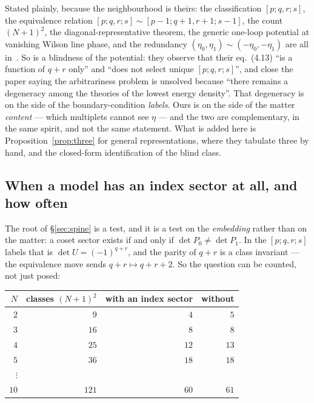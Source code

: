 \documentclass[11pt,a4paper]{article}
\begin{document}
Stated plainly, because the neighbourhood is theirs: the classification $[p;q,r;s]$, the equivalence
relation $[p;q,r;s]\sim[p-1;q+1,r+1;s-1]$, the count $(N+1)^2$, the diagonal-representative theorem,
the generic one-loop potential at vanishing Wilson line phase, and the redundancy
$(\eta_0,\eta_1)\sim(-\eta_0,-\eta_1)$ are all in~\cite{HHK}. So is a blindness of the potential:
they observe that their eq.~(4.13) ``is a function of $q+r$ only'' and ``does not select unique
$[p;q,r;s]$'', and close the paper saying the arbitrariness problem is unsolved because ``there
remains a degeneracy among the theories of the lowest energy density''. That degeneracy is on the
side of the boundary-condition \emph{labels}. Ours is on the side of the matter \emph{content} ---
which multiplets cannot see $\eta$ --- and the two are complementary, in the same spirit, and not the
same statement. What is added here is Proposition~\ref{prop:three} for general representations,
where they tabulate three by hand, and the closed-form identification of the blind class.

\subsection*{When a model has an index sector at all, and how often}

The root of \S\ref{sec:spine} is a test, and it is a test on the \emph{embedding} rather than on the
matter: a coset sector exists if and only if $\det P_0\neq\det P_1$. In the $[p;q,r;s]$ labels that is
$\det U=(-1)^{q+r}$, and the parity of $q+r$ is a class invariant --- the equivalence move sends
$q+r\mapsto q+r+2$. So the question can be counted, not just posed:

\begin{center}\small
{}
\begin{tabular}{rrrr}
\toprule
\rowcolor{hdrblue!14}$N$ & classes $(N+1)^2$ & with an index sector & without\\
\midrule
$2$ & $9$ & $4$ & $5$\\
$3$ & $16$ & $8$ & $8$\\
$4$ & $25$ & $12$ & $13$\\
$5$ & $36$ & $18$ & $18$\\
$\vdots$ & & & \\
$10$ & $121$ & $60$ & $61$\\
\bottomrule
\end{tabular}
\end{center}
\end{document}
